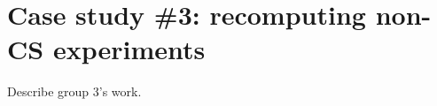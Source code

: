 \section{Case study \#3: recomputing non-CS experiments}
\label{s:group3}

Describe group 3's work.
